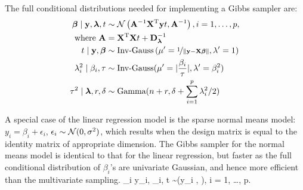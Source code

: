 \documentclass[11pt]{article}
\begin{document}
The full conditional distributions needed for implementing a Gibbs sampler are:	
\begin{align}
\boldsymbol{\beta} \mid {\bf y}, \boldsymbol{\lambda}, t & \sim \mathcal{N} \left( {\bf A}^{-1}{\bf X}^{\rm T} {\bf y} t , {\bf A}^{-1} \right), i = 1, \ldots, p, \\
\text{ where } {\bf A} & = {\bf X}^{\rm T} {\bf X} t + {\bf D}_{\boldsymbol{\lambda}}^{-1} \\
t \mid {\bf y}, \boldsymbol{\beta} & \sim \text{Inv-Gauss} \left(\mu' = \nicefrac{1}{\lVert{\bf y}-{\bf X}\boldsymbol{\beta}\rVert}, \lambda' = 1 \right) \\
\lambda_i^2 \mid \beta_i, \tau & \sim \text{Inv-Gauss}(\mu' = \lvert\frac{\beta_i}{\tau}\rvert, \lambda' = \beta_i^2)\\
\tau^2 \mid \boldsymbol{\lambda}, r, \delta & \sim \text{Gamma}(n + r, \delta + \sum_{i=1}^{p} \lambda_i^2/2)
\end{align}

A special case of the linear regression model is the sparse normal means model: $y_i = \beta_i + \epsilon_i$, $\epsilon_i \sim \mathcal{N}(0,\sigma^2)$, which results when the design matrix is equal to the identity matrix of appropriate dimension. The Gibbs sampler for the normal means model is identical to that for the linear regression, but faster as the full conditional distribution of $\beta_i$'s are univariate Gaussian, and hence more efficient than the multivariate sampling. 
\beq
\beta_i \mid y_i, \lambda_i, t \sim \NormRV \left(y_i ,  \right), i = 1, \ldots, p.
\eeq

%

%



\end{document}
